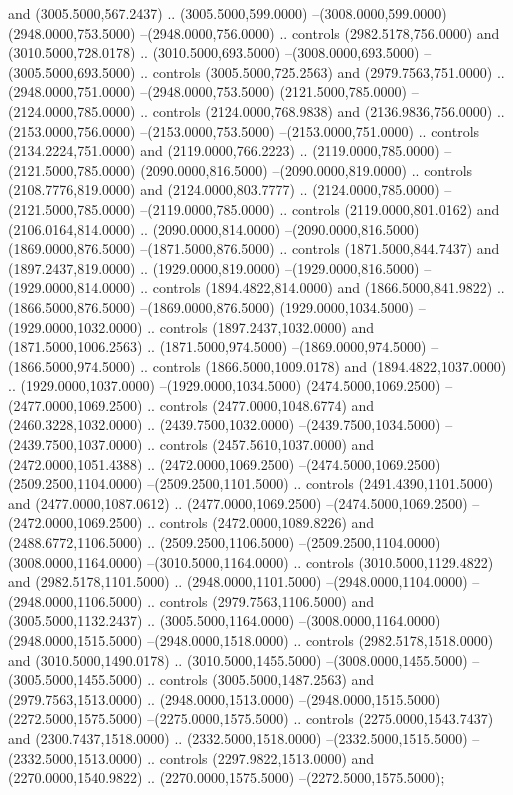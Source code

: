 and (3005.5000,567.2437) .. (3005.5000,599.0000) --(3008.0000,599.0000) (2948.0000,753.5000) --(2948.0000,756.0000) .. controls (2982.5178,756.0000) and (3010.5000,728.0178) .. (3010.5000,693.5000) --(3008.0000,693.5000) --(3005.5000,693.5000) .. controls (3005.5000,725.2563) and (2979.7563,751.0000) .. (2948.0000,751.0000) --(2948.0000,753.5000) (2121.5000,785.0000) --(2124.0000,785.0000) .. controls (2124.0000,768.9838) and (2136.9836,756.0000) .. (2153.0000,756.0000) --(2153.0000,753.5000) --(2153.0000,751.0000) .. controls (2134.2224,751.0000) and (2119.0000,766.2223) .. (2119.0000,785.0000) --(2121.5000,785.0000) (2090.0000,816.5000) --(2090.0000,819.0000) .. controls (2108.7776,819.0000) and (2124.0000,803.7777) .. (2124.0000,785.0000) --(2121.5000,785.0000) --(2119.0000,785.0000) .. controls (2119.0000,801.0162) and (2106.0164,814.0000) .. (2090.0000,814.0000) --(2090.0000,816.5000) (1869.0000,876.5000) --(1871.5000,876.5000) .. controls (1871.5000,844.7437) and (1897.2437,819.0000) .. (1929.0000,819.0000) --(1929.0000,816.5000) --(1929.0000,814.0000) .. controls (1894.4822,814.0000) and (1866.5000,841.9822) .. (1866.5000,876.5000) --(1869.0000,876.5000) (1929.0000,1034.5000) --(1929.0000,1032.0000) .. controls (1897.2437,1032.0000) and (1871.5000,1006.2563) .. (1871.5000,974.5000) --(1869.0000,974.5000) --(1866.5000,974.5000) .. controls (1866.5000,1009.0178) and (1894.4822,1037.0000) .. (1929.0000,1037.0000) --(1929.0000,1034.5000) (2474.5000,1069.2500) --(2477.0000,1069.2500) .. controls (2477.0000,1048.6774) and (2460.3228,1032.0000) .. (2439.7500,1032.0000) --(2439.7500,1034.5000) --(2439.7500,1037.0000) .. controls (2457.5610,1037.0000) and (2472.0000,1051.4388) .. (2472.0000,1069.2500) --(2474.5000,1069.2500) (2509.2500,1104.0000) --(2509.2500,1101.5000) .. controls (2491.4390,1101.5000) and (2477.0000,1087.0612) .. (2477.0000,1069.2500) --(2474.5000,1069.2500) --(2472.0000,1069.2500) .. controls (2472.0000,1089.8226) and (2488.6772,1106.5000) .. (2509.2500,1106.5000) --(2509.2500,1104.0000) (3008.0000,1164.0000) --(3010.5000,1164.0000) .. controls (3010.5000,1129.4822) and (2982.5178,1101.5000) .. (2948.0000,1101.5000) --(2948.0000,1104.0000) --(2948.0000,1106.5000) .. controls (2979.7563,1106.5000) and (3005.5000,1132.2437) .. (3005.5000,1164.0000) --(3008.0000,1164.0000) (2948.0000,1515.5000) --(2948.0000,1518.0000) .. controls (2982.5178,1518.0000) and (3010.5000,1490.0178) .. (3010.5000,1455.5000) --(3008.0000,1455.5000) --(3005.5000,1455.5000) .. controls (3005.5000,1487.2563) and (2979.7563,1513.0000) .. (2948.0000,1513.0000) --(2948.0000,1515.5000) (2272.5000,1575.5000) --(2275.0000,1575.5000) .. controls (2275.0000,1543.7437) and (2300.7437,1518.0000) .. (2332.5000,1518.0000) --(2332.5000,1515.5000) --(2332.5000,1513.0000) .. controls (2297.9822,1513.0000) and (2270.0000,1540.9822) .. (2270.0000,1575.5000) --(2272.5000,1575.5000);
